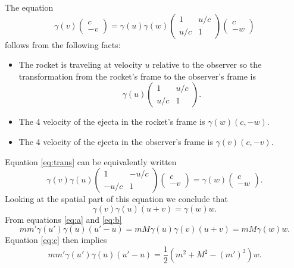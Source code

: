 \documentclass[minion]{homework}
\begin{document}
\begin{aproblems}
\subsol
The equation
\begin{equation}\label{eq:trans}
\gamma(v)\begin{pmatrix} c \\-v\end{pmatrix} = \gamma(u)\gamma(w)\begin{pmatrix} 1 & u/c \\ u/c & 1\end{pmatrix}\begin{pmatrix} c \\-w\end{pmatrix}
\end{equation}
follows from the following facts:
\begin{itemize}
\item The rocket is traveling at velocity $u$ relative to the observer so 
the transformation from the rocket's frame to the observer's frame is
\begin{equation}
\gamma(u)\begin{pmatrix} 1 & u/c \\ u/c & 1\end{pmatrix}.
\end{equation}
\item The 4 velocity of the ejecta in the rocket's frame is $\gamma(w)(c,-w)$.
\item The 4 velocity of the ejecta in the observer's frame is $\gamma(v)(c,-v)$.
\end{itemize}
\subsol
Equation \eqref{eq:trans} can be equivalently written
\begin{equation}
\gamma(v)\gamma(u)\begin{pmatrix} 1 & -u/c \\ -u/c & 1\end{pmatrix}\begin{pmatrix} c \\-v\end{pmatrix} = \gamma(w)\begin{pmatrix} c \\-w\end{pmatrix}.
\end{equation}
Looking at the spatial part of this equation we conclude that
\begin{equation}\label{eq:b}
\gamma(v)\gamma(u)(u+v) = \gamma(w)w.
\end{equation}
From equations \eqref{eq:a} and  \eqref{eq:b}
\begin{equation}
mm'\gamma(u')\gamma(u)(u'-u) = mM\gamma(u)\gamma(v)(u+v) = mM\gamma(w)w.
\end{equation}
Equation \eqref{eq:c} then implies
\begin{equation}
mm'\gamma(u')\gamma(u)(u'-u) = \frac{1}{2}(m^2+M^2-(m')^2)w.
\end{equation}


\end{aproblems}
\end{document}
